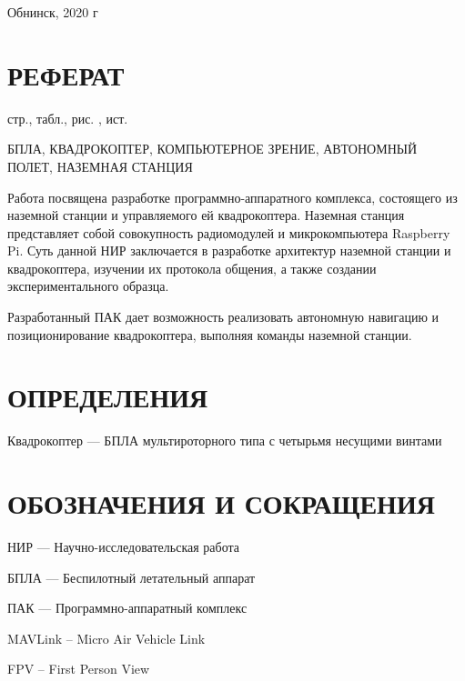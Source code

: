 \documentclass[a4paper,12pt]{article}
\newcounter{mycitecount}                                %
\begin{document}
\vfill
\large

\begin{center}
Обнинск, 2020 г
\end{center}

\onehalfspacing

\pagebreak

\thispagestyle{empty}

\section*{\centering РЕФЕРАТ}
 стр.,  табл.,  рис. , \totalmycitecounts ист. 

БПЛА, КВАДРОКОПТЕР, КОМПЬЮТЕРНОЕ ЗРЕНИЕ, АВТОНОМНЫЙ ПОЛЕТ, НАЗЕМНАЯ СТАНЦИЯ

Работа посвящена разработке программно-аппаратного комплекса, состоящего из наземной станции и управляемого ей квадрокоптера. Наземная станция представляет собой совокупность радиомодулей и микрокомпьютера Raspberry Pi. Суть данной НИР заключается в разработке архитектур наземной станции и квадрокоптера, изучении их протокола общения, а также создании экспериментального образца.

Разработанный ПАК дает возможность реализовать автономную навигацию и позиционирование квадрокоптера, выполняя команды наземной станции.

\pagebreak
\thispagestyle{empty}

\section*{\centering ОПРЕДЕЛЕНИЯ}

Квадрокоптер --- БПЛА мультироторного типа с четырьмя несущими винтами
\pagebreak

\section*{\centering ОБОЗНАЧЕНИЯ И СОКРАЩЕНИЯ}

НИР --- Научно-исследовательская работа

БПЛА --- Беспилотный летательный аппарат

ПАК --- Программно-аппаратный комплекс

MAVLink -- Micro Air Vehicle Link

FPV -- First Person View
\end{document}
